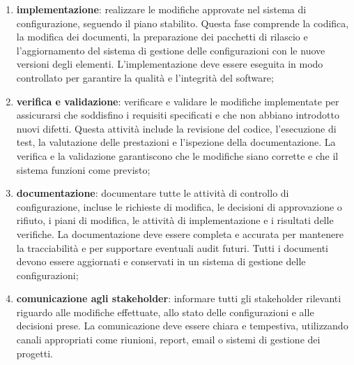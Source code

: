 \begin{enumerate}
	\item \textbf{implementazione}: realizzare le modifiche approvate nel sistema di configurazione, seguendo il piano stabilito. Questa fase comprende la codifica, la modifica dei documenti, la preparazione dei pacchetti di rilascio e l'aggiornamento del sistema di gestione delle configurazioni con le nuove versioni degli elementi. L'implementazione deve essere eseguita in modo controllato per garantire la qualità e l'integrità del software;
	\item \textbf{verifica e validazione}: verificare e validare le modifiche implementate per assicurarsi che soddisfino i requisiti specificati e che non abbiano introdotto nuovi difetti. Questa attività include la revisione del codice, l'esecuzione di test, la valutazione delle prestazioni e l'ispezione della documentazione. La verifica e la validazione garantiscono che le modifiche siano corrette e che il sistema funzioni come previsto;
	\item \textbf{documentazione}: documentare tutte le attività di controllo di configurazione, incluse le richieste di modifica, le decisioni di approvazione o rifiuto, i piani di modifica, le attività di implementazione e i risultati delle verifiche. La documentazione deve essere completa e accurata per mantenere la tracciabilità e per supportare eventuali audit futuri. Tutti i documenti devono essere aggiornati e conservati in un sistema di gestione delle configurazioni;
	\item \textbf{comunicazione agli stakeholder}: informare tutti gli stakeholder rilevanti riguardo alle modifiche effettuate, allo stato delle configurazioni e alle decisioni prese. La comunicazione deve essere chiara e tempestiva, utilizzando canali appropriati come riunioni, report, email o sistemi di gestione dei progetti.
\end{enumerate}

